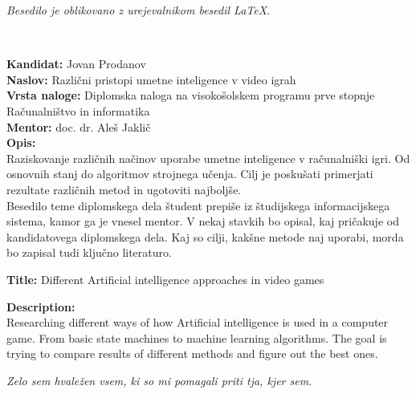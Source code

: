 \documentclass[a4paper, 12pt]{book}
\newcommand{\ttitle}{Različni pristopi umetne inteligence v video igrah}
\newcommand{\ttitleEn}{Different Artificial intelligence approaches in video games}
\newcommand{\tauthor}{Jovan Prodanov}
\newcommand{\clearemptydoublepage}{\newpage{\pagestyle{empty}\cleardoublepage}}
\begin{document}
\begin{center}
\mbox{}\vfill
\emph{Besedilo je oblikovano z urejevalnikom besedil \LaTeX.}
\end{center}

\clearemptydoublepage

\thispagestyle{empty}
\
\vfill

\bigskip
\noindent\textbf{Kandidat:} \tauthor\\
\noindent\textbf{Naslov:} \ttitle\\
\noindent\textbf{Vrsta naloge:} Diplomska naloga na visokošolskem programu prve stopnje Računalništvo in informatika \\
\noindent\textbf{Mentor:} doc. dr. Aleš Jaklič\\

\bigskip
\noindent\textbf{Opis:}\\
Raziskovanje različnih načinov uporabe umetne inteligence v računalniški igri. Od osnovnih stanj do algoritmov strojnega učenja. Cilj je poskušati primerjati rezultate različnih metod in ugotoviti najboljše.\\
Besedilo teme diplomskega dela študent prepiše iz študijskega informacijskega sistema, kamor ga je vnesel mentor. 
V nekaj stavkih bo opisal, kaj pričakuje od kandidatovega diplomskega dela. 
Kaj so cilji, kakšne metode naj uporabi, morda bo zapisal tudi ključno literaturo.

\bigskip
\noindent\textbf{Title:} \ttitleEn

\bigskip
\noindent\textbf{Description:}\\
Researching different ways of how Artificial intelligence is used in a computer game. From basic state machines to machine learning algorithms. The goal is trying to compare results of different methods and figure out the best ones.


\vfill

\vspace{2cm}

\clearemptydoublepage

\thispagestyle{empty}\mbox{}\vfill\null\it%
\noindent
Zelo sem hvaležen vsem, ki so mi pomagali priti tja, kjer sem.
\rm\normalfont

\clearemptydoublepage

\end{document}
